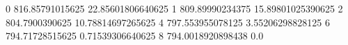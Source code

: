 0 816.85791015625 22.85601806640625
1 809.89990234375 15.89801025390625
2 804.7900390625 10.78814697265625
4 797.553955078125 3.55206298828125
6 794.71728515625 0.71539306640625
8 794.0018920898438 0.0
